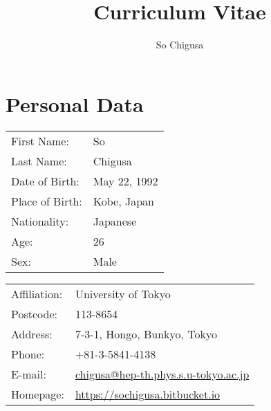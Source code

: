 \documentclass[12pt]{article}
\title{\vspace{-2cm}\textbf{Curriculum Vitae}}
\author{So Chigusa}
\begin{document}
\large
\maketitle

\newcommand{\lsim}{\stackrel{<}{_\sim}}
\newcommand{\gsim}{\stackrel{>}{_\sim}}

\newcommand{\rem}[1]{{$\spadesuit$\bf #1$\spadesuit$}}


\renewcommand{\thefootnote}{\arabic{footnote})}
\setcounter{footnote}{0}

\vspace{-5mm}
\section*{Personal Data}

\vspace{-3mm}

\begin{table}[h]
 \begin{tabular}{ll}
  First Name: & So %
      \\
  Last Name: & Chigusa %
      \\
  Date of Birth: & May 22, 1992 \\
  Place of Birth: & Kobe, Japan \\
  Nationality: & Japanese \\
  Age: & 26 \\
  Sex: & Male \\
 \end{tabular}
\end{table}

\vspace{-5mm}
\begin{table}[h]
 \begin{tabular}{ll}
  Affiliation: & University of Tokyo \\
  Postcode: & 113-8654 \\
  Address: & 7-3-1, Hongo, Bunkyo, Tokyo \\
  Phone: & +81-3-5841-4138 \\
  E-mail: &
      \href{mailto:chigusa@hep-th.phys.s.u-tokyo.ac.jp}{chigusa@hep-th.phys.s.u-tokyo.ac.jp}
      \\
  Homepage: & \url{https://sochigusa.bitbucket.io} \\
 \end{tabular}
\end{table}
\end{document}

